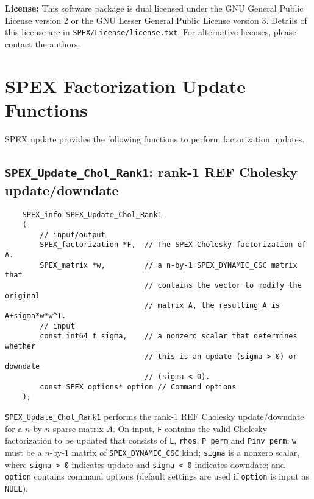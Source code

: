 \documentclass[12pt,oneside]{book}
\theoremstyle{definition}
\begin{document}
{\noindent \textbf{License:} This software package is dual licensed under the GNU General Public License version 2 or the GNU Lesser General Public License version 3. Details of this license are in \verb|SPEX/License/license.txt|. For alternative licenses, please contact the authors.


\section{SPEX Factorization Update Functions} 
SPEX update provides the following functions to perform factorization updates.

\subsection{\texttt{SPEX\_Update\_Chol\_Rank1}: rank-1 REF Cholesky update/downdate}\label{ss:SPEX_Update_Chol_Rank1}
\begin{mdframed}[userdefinedwidth=\textwidth]
{\footnotesize
\begin{verbatim}
    SPEX_info SPEX_Update_Chol_Rank1
    (
        // input/output
        SPEX_factorization *F,  // The SPEX Cholesky factorization of A. 
        SPEX_matrix *w,         // a n-by-1 SPEX_DYNAMIC_CSC matrix that
                                // contains the vector to modify the original
                                // matrix A, the resulting A is A+sigma*w*w^T. 
        // input
        const int64_t sigma,    // a nonzero scalar that determines whether
                                // this is an update (sigma > 0) or downdate
                                // (sigma < 0).
        const SPEX_options* option // Command options
    );
\end{verbatim}
} \end{mdframed}

\verb|SPEX_Update_Chol_Rank1| performs the rank-1 REF Cholesky update/downdate for a $n$-by-$n$ sparse matrix $A$. On input, \verb|F| contains the valid Cholesky factorization to be updated that consists of \verb|L|, \verb|rhos|, \verb|P_perm| and \verb|Pinv_perm|; \verb|w| must be a $n$-by-$1$  matrix of \verb|SPEX_DYNAMIC_CSC| kind; \verb|sigma| is a nonzero scalar, where \verb|sigma > 0| indicates update and \verb|sigma < 0| indicates downdate; and \verb|option| contains command options (default settings are used if \verb|option| is input as \verb|NULL|).

}
\end{document}
